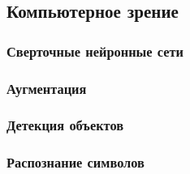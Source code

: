 \subsection{Компьютерное зрение}




\subsubsection{Сверточные нейронные сети}



\subsubsection{Аугментация}



\subsubsection{Детекция объектов}




\subsubsection{Распознание символов}
